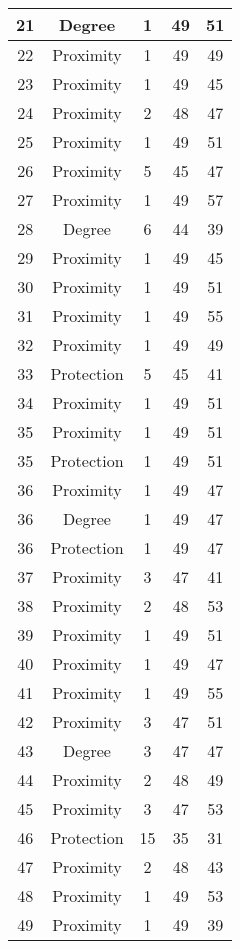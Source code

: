 \documentclass[results.tex]{subfiles}
\begin{document}
\begin{center}
\begin{tabular}{| c || c | c | c | c |}
    \hline
    21 & Degree & 1 & 49 & 51 \\ 
    \hline
    22 & Proximity & 1 & 49 & 49 \\ 
    \hline
    23 & Proximity & 1 & 49 & 45 \\ 
    \hline
    24 & Proximity & 2 & 48 & 47 \\ 
    \hline
    25 & Proximity & 1 & 49 & 51 \\ 
    \hline
    26 & Proximity & 5 & 45 & 47 \\ 
    \hline
    27 & Proximity & 1 & 49 & 57 \\ 
    \hline
    28 & Degree & 6 & 44 & 39 \\ 
    \hline
    29 & Proximity & 1 & 49 & 45 \\ 
    \hline
    30 & Proximity & 1 & 49 & 51 \\ 
    \hline
    31 & Proximity & 1 & 49 & 55 \\ 
    \hline
    32 & Proximity & 1 & 49 & 49 \\ 
    \hline
    33 & Protection & 5 & 45 & 41 \\ 
    \hline
    34 & Proximity & 1 & 49 & 51 \\ 
    \hline
    35 & Proximity & 1 & 49 & 51 \\ 
    \hline
    35 & Protection & 1 & 49 & 51 \\ 
    \hline
    36 & Proximity & 1 & 49 & 47 \\ 
    \hline
    36 & Degree & 1 & 49 & 47 \\ 
    \hline
    36 & Protection & 1 & 49 & 47 \\ 
    \hline
    37 & Proximity & 3 & 47 & 41 \\ 
    \hline
    38 & Proximity & 2 & 48 & 53 \\ 
    \hline
    39 & Proximity & 1 & 49 & 51 \\ 
    \hline
    40 & Proximity & 1 & 49 & 47 \\ 
    \hline
    41 & Proximity & 1 & 49 & 55 \\ 
    \hline
    42 & Proximity & 3 & 47 & 51 \\ 
    \hline
    43 & Degree & 3 & 47 & 47 \\ 
    \hline
    44 & Proximity & 2 & 48 & 49 \\ 
    \hline
    45 & Proximity & 3 & 47 & 53 \\ 
    \hline
    46 & Protection & 15 & 35 & 31 \\ 
    \hline
    47 & Proximity & 2 & 48 & 43 \\ 
    \hline
    48 & Proximity & 1 & 49 & 53 \\ 
    \hline
    49 & Proximity & 1 & 49 & 39 \\ 
    \hline   \end{tabular}
\end{center}
\end{document}
